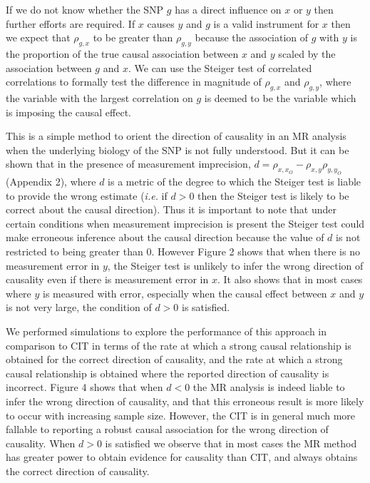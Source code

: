 \documentclass[]{article}
\begin{document}
If we do not know whether the SNP \(g\) has a direct influence on \(x\)
or \(y\) then further efforts are required. If \(x\) causes \(y\) and
\(g\) is a valid instrument for \(x\) then we expect that \(\rho_{g,x}\)
to be greater than \(\rho_{g,y}\) because the association of \(g\) with
\(y\) is the proportion of the true causal association between \(x\) and
\(y\) scaled by the association between \(g\) and \(x\). We can use the
Steiger test of correlated correlations to formally test the difference
in magnitude of \(\rho_{g,x}\) and \(\rho_{g,y}\), where the variable
with the largest correlation on \(g\) is deemed to be the variable which
is imposing the causal effect.

This is a simple method to orient the direction of causality in an MR
analysis when the underlying biology of the SNP is not fully understood.
But it can be shown that in the presence of measurement imprecision,
\(d = \rho_{x, x_O} - \rho_{x,y}\rho_{y,y_O}\) (Appendix 2), where \(d\)
is a metric of the degree to which the Steiger test is liable to provide
the wrong estimate (\emph{i.e.} if \(d>0\) then the Steiger test is
likely to be correct about the causal direction). Thus it is important
to note that under certain conditions when measurement imprecision is
present the Steiger test could make erroneous inference about the causal
direction because the value of \(d\) is not restricted to being greater
than 0. However Figure 2 shows that when there is no measurement error
in \(y\), the Steiger test is unlikely to infer the wrong direction of
causality even if there is measurement error in \(x\). It also shows
that in most cases where \(y\) is measured with error, especially when
the causal effect between \(x\) and \(y\) is not very large, the
condition of \(d > 0\) is satisfied.

We performed simulations to explore the performance of this approach in
comparison to CIT in terms of the rate at which a strong causal
relationship is obtained for the correct direction of causality, and the
rate at which a strong causal relationship is obtained where the
reported direction of causality is incorrect. Figure 4 shows that when
\(d < 0\) the MR analysis is indeed liable to infer the wrong direction
of causality, and that this erroneous result is more likely to occur
with increasing sample size. However, the CIT is in general much more
fallable to reporting a robust causal association for the wrong
direction of causality. When \(d > 0\) is satisfied we observe that in
most cases the MR method has greater power to obtain evidence for
causality than CIT, and always obtains the correct direction of
causality.
\end{document}
